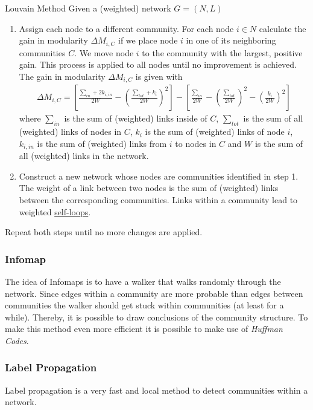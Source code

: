\documentclass[english]{panikzettel}
\begin{document}
\begin{algo}{Louvain Method}
Given a (weighted) network $ G = (N,L) $ 

\begin{enumerate}
	\item Assign each node to a different community.
	For each node $ i \in N $ calculate the gain in modularity $ \Delta M_{i,C} $ if we place node $ i $ in one of its neighboring communities $ C $. 
	We move node $ i $ to the community with the largest, positive gain.
	This process is applied to all nodes until no improvement is achieved.
	The gain in modularity $ \Delta M_{i,C} $ is given with
	\begin{align*}
		\Delta M_{i,C} = \left[\frac{\sum_{in} + 2 k _{i,in}}{2W} - \left(\frac{\sum_{tot} + k_i}{2W}\right)^2\right] - \left[\frac{\sum_{in}}{2W} - \left(\frac{\sum_{tot}}{2W}\right)^2 - \left(\frac{k_i}{2W}\right)^2\right]
	\end{align*}
	where $ \sum_{in} $ is the sum of (weighted) links inside of $ C $, $ \sum_{tot} $ is the sum of all (weighted) links of nodes in $ C $, $ k_i $ is the sum of (weighted) links of node $ i $, $ k_{i,in} $ is the sum of (weighted) links from $ i $ to nodes in $ C $ and $ W $ is the sum of all (weighted) links in the network.
	\item Construct a new network whose nodes are communities identified in step 1.
	The weight of a link between two nodes is the sum of (weighted) links between the corresponding communities. 
	Links within a community lead to weighted \hyperref[sec:graph_basics]{self-loops}.
\end{enumerate}

Repeat both steps until no more changes are applied.
\end{algo}

\subsubsection{Infomap}
The idea of Infomaps is to have a walker that walks randomly through the network.
Since edges within a community are more probable than edges between communities the walker should get stuck within communities (at least for a while).
Thereby, it is possible to draw conclusions of the community structure.
To make this method even more efficient it is possible to make use of \textit{Huffman Codes}.

\subsubsection{Label Propagation}
Label propagation is a very fast and local method to detect communities within a network.
\end{document}
